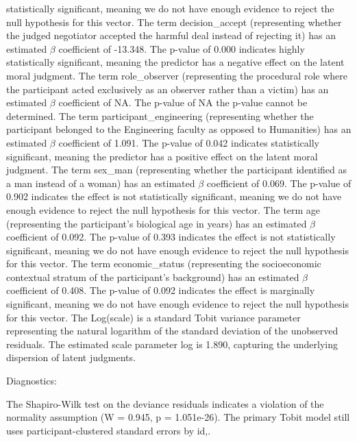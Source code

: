\documentclass[11pt]{article}
\begin{document}
statistically significant, meaning we do not have enough evidence to reject the null hypothesis for this vector. The term decision\_accept (representing whether the judged negotiator accepted the harmful deal instead of rejecting it) has an estimated $\beta$ coefficient of -13.348. The p-value of 0.000 indicates highly statistically significant, meaning the predictor has a negative effect on the latent moral judgment. The term role\_observer (representing the procedural role where the participant acted exclusively as an observer rather than a victim) has an estimated $\beta$ coefficient of NA. The p-value of NA the p-value cannot be determined. The term participant\_engineering (representing whether the participant belonged to the Engineering faculty as opposed to Humanities) has an estimated $\beta$ coefficient of 1.091. The p-value of 0.042 indicates statistically significant, meaning the predictor has a positive effect on the latent moral judgment. The term sex\_man (representing whether the participant identified as a man instead of a woman) has an estimated $\beta$ coefficient of 0.069. The p-value of 0.902 indicates the effect is not statistically significant, meaning we do not have enough evidence to reject the null hypothesis for this vector. The term age (representing the participant's biological age in years) has an estimated $\beta$ coefficient of 0.092. The p-value of 0.393 indicates the effect is not statistically significant, meaning we do not have enough evidence to reject the null hypothesis for this vector. The term economic\_status (representing the socioeconomic contextual stratum of the participant's background) has an estimated $\beta$ coefficient of 0.408. The p-value of 0.092 indicates the effect is marginally significant, meaning we do not have enough evidence to reject the null hypothesis for this vector. The Log(scale) is a standard Tobit variance parameter representing the natural logarithm of the standard deviation of the unobserved residuals. The estimated scale parameter log is 1.890, capturing the underlying dispersion of latent judgments.

Diagnostics:

The Shapiro-Wilk test on the deviance residuals indicates a violation of the normality assumption (W = 0.945, p = 1.051e-26). The primary Tobit model still uses participant-clustered standard errors by id,.
\end{document}
